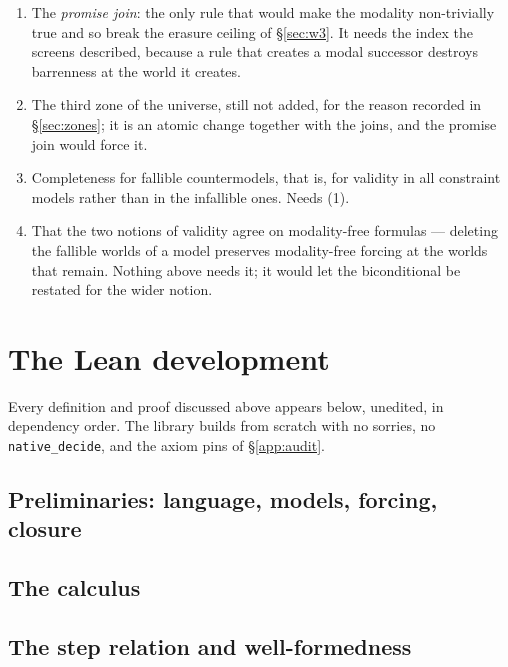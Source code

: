 \documentclass[11pt,a4paper]{article}
\begin{document}
\begin{enumerate}
\item The \emph{promise join}: the only rule that would make the modality
  non-trivially true and so break the erasure ceiling of \S\ref{sec:w3}.
  It needs the index the screens described, because a rule that creates a
  modal successor destroys barrenness at the world it creates.
\item The third zone of the universe, still not added, for the reason
  recorded in \S\ref{sec:zones}; it is an atomic change together with the
  joins, and the promise join would force it.
\item Completeness for fallible countermodels, that is, for validity in
  all constraint models rather than in the infallible ones. Needs (1).
\item That the two notions of validity agree on modality-free formulas
  --- deleting the fallible worlds of a model preserves modality-free
  forcing at the worlds that remain. Nothing above needs it; it would let
  the biconditional be restated for the wider notion.
\end{enumerate}

\appendix
\section{The Lean development}
\label{app:code}

Every definition and proof discussed above appears below, unedited, in
dependency order. The library builds from scratch with no sorries, no
\texttt{native\_decide}, and the axiom pins of \S\ref{app:audit}.

\subsection{Preliminaries: language, models, forcing, closure}
\label{app:basic}


\subsection{The calculus}
\label{app:calculus}


\subsection{The step relation and well-formedness}
\label{app:step}

\end{document}
